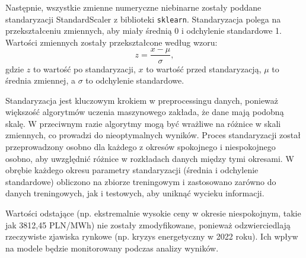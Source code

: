 Następnie, wszystkie zmienne numeryczne niebinarne zostały poddane standaryzacji StandardScaler z biblioteki \texttt{sklearn}. Standaryzacja polega na przekształceniu zmiennych, aby miały średnią 0 i odchylenie standardowe 1. Wartości zmiennych zostały przekształcone według wzoru:
\[ z = \frac{x - \mu}{\sigma}, \]
gdzie \( z \) to wartość po standaryzacji, \( x \) to wartość przed standaryzacją, \( \mu \) to średnia zmiennej, a \( \sigma \) to odchylenie standardowe. 

Standaryzacja jest kluczowym krokiem w preprocessingu danych, ponieważ większość algorytmów uczenia maszynowego zakłada, że dane mają podobną skalę. W przeciwnym razie algorytmy mogą być wrażliwe na różnice w skali zmiennych, co prowadzi do nieoptymalnych wyników. Proces standaryzacji został przeprowadzony osobno dla każdego z okresów spokojnego i niespokojnego osobno, aby uwzględnić różnice w rozkładach danych między tymi okresami. W obrębie każdego okresu parametry standaryzacji (średnia i odchylenie standardowe) obliczono na zbiorze treningowym i zastosowano zarówno do danych treningowych, jak i testowych, aby uniknąć wycieku informacji.

Wartości odstające (np. ekstremalnie wysokie ceny w okresie niespokojnym, takie jak 3812,45 PLN/MWh) nie zostały zmodyfikowane, ponieważ odzwierciedlają rzeczywiste zjawiska rynkowe (np. kryzys energetyczny w 2022 roku). Ich wpływ na modele będzie monitorowany podczas analizy wyników.

